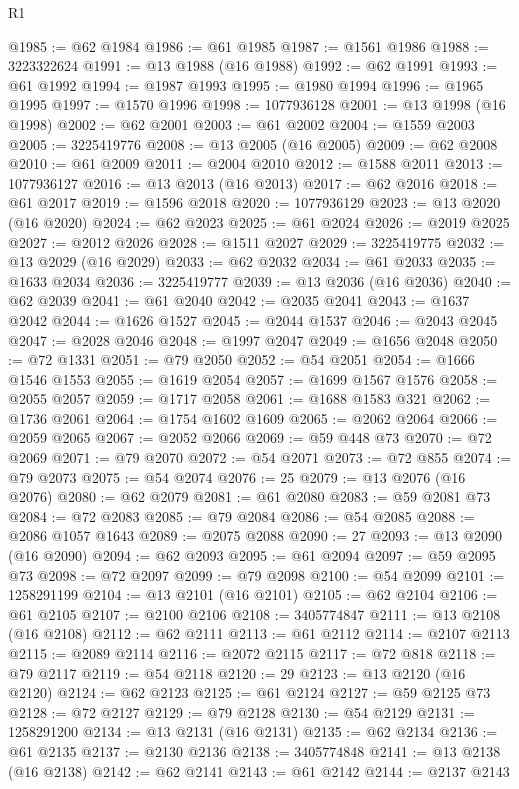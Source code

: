\begin{lexlean}{R1}
\begin{coremodule}
@1985 := @62 @1984
@1986 := @61 @1985
@1987 := @1561 @1986
@1988 := 3223322624
@1991 := @13 @1988 (@16 @1988)
@1992 := @62 @1991
@1993 := @61 @1992
@1994 := @1987 @1993
@1995 := @1980 @1994
@1996 := @1965 @1995
@1997 := @1570 @1996
@1998 := 1077936128
@2001 := @13 @1998 (@16 @1998)
@2002 := @62 @2001
@2003 := @61 @2002
@2004 := @1559 @2003
@2005 := 3225419776
@2008 := @13 @2005 (@16 @2005)
@2009 := @62 @2008
@2010 := @61 @2009
@2011 := @2004 @2010
@2012 := @1588 @2011
@2013 := 1077936127
@2016 := @13 @2013 (@16 @2013)
@2017 := @62 @2016
@2018 := @61 @2017
@2019 := @1596 @2018
@2020 := 1077936129
@2023 := @13 @2020 (@16 @2020)
@2024 := @62 @2023
@2025 := @61 @2024
@2026 := @2019 @2025
@2027 := @2012 @2026
@2028 := @1511 @2027
@2029 := 3225419775
@2032 := @13 @2029 (@16 @2029)
@2033 := @62 @2032
@2034 := @61 @2033
@2035 := @1633 @2034
@2036 := 3225419777
@2039 := @13 @2036 (@16 @2036)
@2040 := @62 @2039
@2041 := @61 @2040
@2042 := @2035 @2041
@2043 := @1637 @2042
@2044 := @1626 @1527
@2045 := @2044 @1537
@2046 := @2043 @2045
@2047 := @2028 @2046
@2048 := @1997 @2047
@2049 := @1656 @2048
@2050 := @72 @1331
@2051 := @79 @2050
@2052 := @54 @2051
@2054 := @1666 @1546 @1553
@2055 := @1619 @2054
@2057 := @1699 @1567 @1576
@2058 := @2055 @2057
@2059 := @1717 @2058
@2061 := @1688 @1583 @321
@2062 := @1736 @2061
@2064 := @1754 @1602 @1609
@2065 := @2062 @2064
@2066 := @2059 @2065
@2067 := @2052 @2066
@2069 := @59 @448 @73
@2070 := @72 @2069
@2071 := @79 @2070
@2072 := @54 @2071
@2073 := @72 @855
@2074 := @79 @2073
@2075 := @54 @2074
@2076 := 25
@2079 := @13 @2076 (@16 @2076)
@2080 := @62 @2079
@2081 := @61 @2080
@2083 := @59 @2081 @73
@2084 := @72 @2083
@2085 := @79 @2084
@2086 := @54 @2085
@2088 := @2086 @1057 @1643
@2089 := @2075 @2088
@2090 := 27
@2093 := @13 @2090 (@16 @2090)
@2094 := @62 @2093
@2095 := @61 @2094
@2097 := @59 @2095 @73
@2098 := @72 @2097
@2099 := @79 @2098
@2100 := @54 @2099
@2101 := 1258291199
@2104 := @13 @2101 (@16 @2101)
@2105 := @62 @2104
@2106 := @61 @2105
@2107 := @2100 @2106
@2108 := 3405774847
@2111 := @13 @2108 (@16 @2108)
@2112 := @62 @2111
@2113 := @61 @2112
@2114 := @2107 @2113
@2115 := @2089 @2114
@2116 := @2072 @2115
@2117 := @72 @818
@2118 := @79 @2117
@2119 := @54 @2118
@2120 := 29
@2123 := @13 @2120 (@16 @2120)
@2124 := @62 @2123
@2125 := @61 @2124
@2127 := @59 @2125 @73
@2128 := @72 @2127
@2129 := @79 @2128
@2130 := @54 @2129
@2131 := 1258291200
@2134 := @13 @2131 (@16 @2131)
@2135 := @62 @2134
@2136 := @61 @2135
@2137 := @2130 @2136
@2138 := 3405774848
@2141 := @13 @2138 (@16 @2138)
@2142 := @62 @2141
@2143 := @61 @2142
@2144 := @2137 @2143

\end{coremodule}
\end{lexlean}

